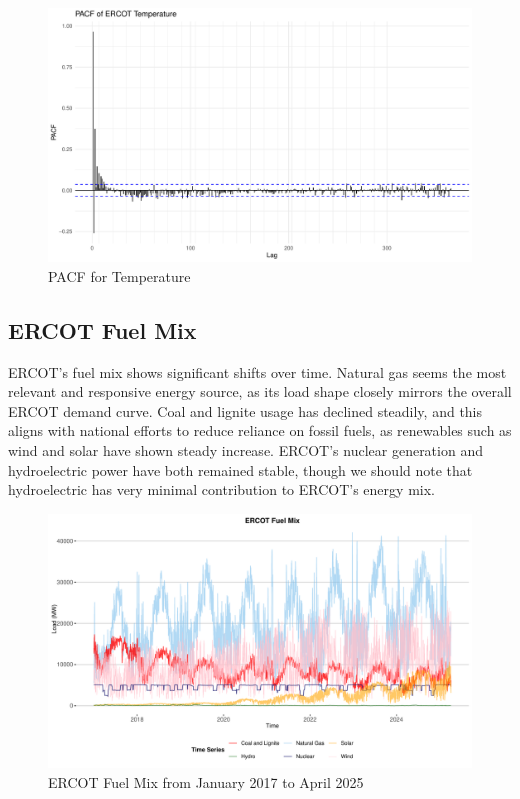 \documentclass[
]{article}
\begin{document}
\begin{figure}
\centering
\includegraphics{FinalProject_Report_files/figure-latex/Temp PACF-1.pdf}
\caption{PACF for Temperature}
\end{figure}

\newpage

\subsection{ERCOT Fuel Mix}\label{ercot-fuel-mix}

ERCOT's fuel mix shows significant shifts over time. Natural gas seems
the most relevant and responsive energy source, as its load shape
closely mirrors the overall ERCOT demand curve. Coal and lignite usage
has declined steadily, and this aligns with national efforts to reduce
reliance on fossil fuels, as renewables such as wind and solar have
shown steady increase. ERCOT's nuclear generation and hydroelectric
power have both remained stable, though we should note that
hydroelectric has very minimal contribution to ERCOT's energy mix.

\begin{figure}
\centering
\includegraphics{FinalProject_Report_files/figure-latex/Plot TS Fuels-1.pdf}
\caption{ERCOT Fuel Mix from January 2017 to April 2025}
\end{figure}
\end{document}
